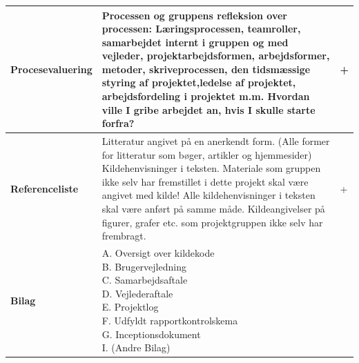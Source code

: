 \begin{longtable}{|p{30mm}|p{90mm}|p{25mm}|}
\textbf{Procesevaluering}   & Processen og gruppens refleksion over processen: Læringsprocessen, teamroller, samarbejdet internt i gruppen og med vejleder, projektarbejdsformen, arbejdsformer, metoder, skriveprocessen, den tidsmæssige styring af projektet,ledelse af projektet, arbejdsfordeling i projektet m.m. 
Hvordan ville I gribe arbejdet an, hvis I skulle starte forfra?
                                        &   +        \\ \hline

\textbf{Referenceliste}   & Litteratur angivet på en anerkendt form. 
(Alle former for litteratur som bøger, artikler og hjemmesider)
Kildehenvisninger i teksten. Materiale som gruppen ikke selv har fremstillet i dette projekt skal være angivet med kilde! 
Alle kildehenvisninger i teksten skal være anført på samme måde. Kildeangivelser på figurer, grafer etc. som projektgruppen ikke selv har frembragt. 
                                        &     +      \\ \hline

\textbf{Bilag}   &
\makecell[l]{
A. Oversigt over kildekode \\
B. Brugervejledning \\
C. Samarbejdsaftale \\
D. Vejlederaftale \\
E. Projektlog \\
F. Udfyldt rapportkontrolskema \\
G. Inceptionsdokument \\
I.  (Andre Bilag) \\
}
                                        &           \\ \hline

\end{longtable}

